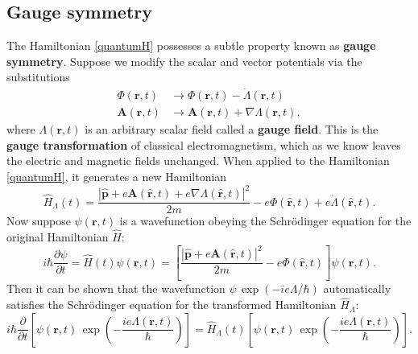 \documentclass[pra,12pt]{revtex4}
\begin{document}
\subsection{Gauge symmetry}
\label{sec:gauge}

The Hamiltonian \eqref{quantumH} possesses a subtle property known as
\textbf{gauge symmetry}.  Suppose we modify the scalar and vector
potentials via the substitutions
\begin{align}
  \Phi(\mathbf{r},t) &\rightarrow \Phi(\mathbf{r},t) - \dot{\Lambda}(\mathbf{r},t) \label{gauge-subst-1} \\
  \mathbf{A}(\mathbf{r},t) &\rightarrow
  \mathbf{A}(\mathbf{r},t) + \nabla{\Lambda}(\mathbf{r},t),
  \label{gauge-subst-2}
\end{align}
where $\Lambda(\mathbf{r},t)$ is an arbitrary scalar field called a
\textbf{gauge field}.  This is the \textbf{gauge transformation} of
classical electromagnetism, which as we know leaves the electric and
magnetic fields unchanged.  When applied to the Hamiltonian
\eqref{quantumH}, it generates a new Hamiltonian
\begin{equation}
  \hat{H}_\Lambda(t)
  = \frac{|\hat{\mathbf{p}}+e\mathbf{A}(\hat{\mathbf{r}},t) + e\nabla\Lambda(\hat{\mathbf{r}},t)|^2}{2m}
  - e\Phi(\hat{\mathbf{r}},t) + e\dot{\Lambda}(\hat{\mathbf{r}},t).
\end{equation}
Now suppose $\psi(\mathbf{r},t)$ is a wavefunction obeying the
Schr\"odinger equation for the original Hamiltonian $\hat{H}$:
\begin{equation}
  i\hbar\frac{\partial\psi}{\partial t} =
  \hat{H}(t) \psi(\mathbf{r},t)
  = \left[\frac{|\hat{\mathbf{p}}+e\mathbf{A}(\hat{\mathbf{r}},t)|^2}{2m}
  - e\Phi(\hat{\mathbf{r}},t) \right]\psi(\mathbf{r},t).
\end{equation}
Then it can be shown that the wavefunction $\psi\,
\exp(-ie\Lambda/\hbar)$ automatically satisfies the Schr\"odinger
equation for the transformed Hamiltonian $\hat{H}_\Lambda$:
\begin{equation}
  i\hbar\frac{\partial}{\partial t} \left[\psi(\mathbf{r},t) \, \exp\left(-\frac{ie\Lambda(\mathbf{r},t)}{\hbar}\right)\right] =
  \hat{H}_\Lambda(t) \left[\psi(\mathbf{r},t) \, \exp\left(-\frac{ie\Lambda(\mathbf{r},t)}{\hbar}\right)\right].
  \label{gaugeschrod}
\end{equation}
\end{document}
